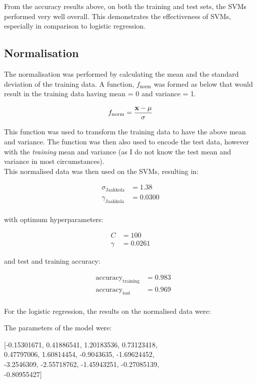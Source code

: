 \documentclass{scrartcl}
\begin{document}
From the accuracy results above, on both the training and test sets, the SVMs performed very well overall. This demonstrates the effectiveness of SVMs, especially in comparison to logistic regression.

\subsection{Normalisation}

The normalisation was performed by calculating the mean and the standard deviation of the training data. A function, $f_{\text{norm}}$ was formed as below that would result in the training data having mean = 0 and variance = 1.

\[ f_{\text{norm}} = \frac {{\mathbf x} - \mu} {\sigma} \]

This function was used to transform the training data to have the above mean and variance. The function was then also used to encode the test data, however with the \emph{training} mean and variance (as I do not know the test mean and variance in most circumstances). \\

This normalised data was then used on the SVMs, resulting in:

\begin{align*}
    \sigma_{\text{Jaakkola}} &= 1.38   \\
    \gamma_{\text{Jaakkola}} &= 0.0300 \\
\end{align*}

with optimum hyperparameters:

\begin{align*}
    C &= 100 \\
    \gamma &= 0.0261
\end{align*}

and test and training accuracy:

\begin{align*}
    & \text{accuracy}_{\text{training}}   &= 0.983 \\
    & \text{accuracy}_{\text{test}}       &= 0.969 \\
\end{align*}

For the logistic regression, the results on the normalised data were:

The parameters of the model were:

\begin{center}
 [-0.15301671,  0.41886541,  1.20183536,  0.73123418, \\
   0.47797006,  1.60814454, -0.9043635, -1.69624452, \\
  -3.2546309, -2.55718762, -1.45943251, -0.27085139, \\
  -0.80955427]
\end{center}
\end{document}
